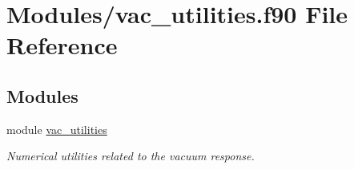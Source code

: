 \hypertarget{vac__utilities_8f90}{}\section{Modules/vac\+\_\+utilities.f90 File Reference}
\label{vac__utilities_8f90}
\subsection*{Modules}
\begin{DoxyCompactItemize}
\item 
module \hyperlink{namespacevac__utilities}{vac\+\_\+utilities}
\begin{DoxyCompactList}\small\item\em Numerical utilities related to the vacuum response. \end{DoxyCompactList}\end{DoxyCompactItemize}
